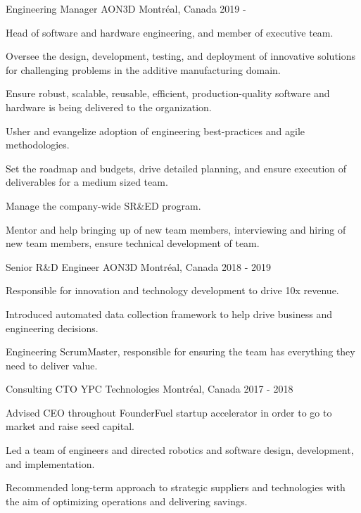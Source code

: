 \begin{cventries}

\cventry
{Engineering Manager}
{AON3D}
{Montréal, Canada}
{2019 - }
{
\begin{cvitems}
\item{Head of software and hardware engineering, and member of executive team.}
\item{Oversee the design, development, testing, and deployment of innovative solutions for challenging problems in the additive manufacturing domain.}
\item{Ensure robust, scalable, reusable, efficient, production-quality software and hardware is being delivered to the organization.}
\item{Usher and evangelize adoption of engineering best-practices and agile methodologies.}
\item{Set the roadmap and budgets, drive detailed planning, and ensure execution of deliverables for a medium sized team.}
\item{Manage the company-wide SR\&ED program.}
\item{Mentor and help bringing up of new team members, interviewing and hiring of new team members, ensure technical development of team.}
\end{cvitems}
}

\cventry
{Senior R\&D Engineer}
{AON3D}
{Montréal, Canada}
{2018 - 2019}
{
\begin{cvitems}
\item{Responsible for innovation and technology development to drive 10x revenue.}
\item{Introduced automated data collection framework to help drive business and engineering decisions.}
\item{Engineering ScrumMaster, responsible for ensuring the team has everything they need to deliver value.}
\end{cvitems}
}

\cventry
{Consulting CTO}
{YPC Technologies}
{Montréal, Canada}
{2017 - 2018}
{
\begin{cvitems}
\item{Advised CEO throughout FounderFuel startup accelerator in order to go to market and raise seed capital.}
\item{Led a team of engineers and directed robotics and software design, development, and implementation.}
\item{Recommended long-term approach to strategic suppliers and technologies with the aim of optimizing operations and delivering savings.}
\end{cvitems}
}


\end{cventries}
